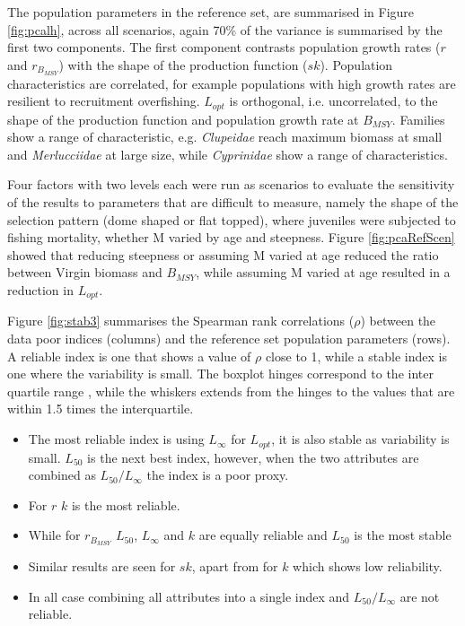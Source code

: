 \documentclass[12pt,doublespacing,a4paper]{ouparticle}
\begin{document}
The population parameters in the reference set, are summarised in Figure \ref{fig:pcalh}, across all scenarios, again 70\% of the variance is summarised by the first two components. The first component contrasts population growth rates ($r$ and $r_{B_{MSY}}$) with the shape of the production function ($sk$). Population characteristics are correlated, for example populations with high growth rates are resilient to recruitment overfishing. $L_{opt}$ is orthogonal, i.e. uncorrelated, to the shape of the production function and population growth rate at $B_{MSY}$. Families show a range of characteristic, e.g. \textit{Clupeidae} reach maximum biomass at small and \textit{Merlucciidae} at large size, while \textit{Cyprinidae} show a range of characteristics.

Four factors with two levels each were run as scenarios to evaluate the sensitivity of the results to parameters that are difficult to measure, namely the shape of the selection pattern (dome shaped or flat topped), where juveniles were subjected to fishing mortality, whether M varied by age and steepness. Figure \ref{fig:pcaRefScen} showed that reducing steepness or assuming M varied at age reduced the ratio between Virgin biomass and $B_{MSY}$, while assuming M varied at age resulted in a reduction in $L_{opt}$. 

Figure \ref{fig:stab3} summarises the Spearman rank correlations ($\rho$) between the data poor indices (columns) and the reference set population parameters (rows). A reliable index is one that shows a value of $\rho$ close to 1, while a stable index is one where the variability is small. The boxplot hinges correspond to the inter quartile range %
, while the whiskers extends from the hinges to the values that are within 1.5 times the interquartile. 

\begin{itemize}
 \item The most reliable index is using $L_\infty$ for $L_{opt}$, it is also stable as variability is small. $L_{50}$ is the next best index, however, when the two attributes are combined as $L_{50}/L_\infty$ the index is a poor proxy.
 \item For $r$ $k$ is the most reliable.
 \item While for $r_{B_{MSY}}$  $L_50$, $L_\infty$ and $k$ are equally reliable and $L_{50}$ is the most stable
 \item Similar results are seen for $sk$, apart from for $k$ which shows low reliability.
 \item In all case combining all attributes into a single index and $L_{50}/L_\infty$ are not reliable. 
\end{itemize}
\end{document}
